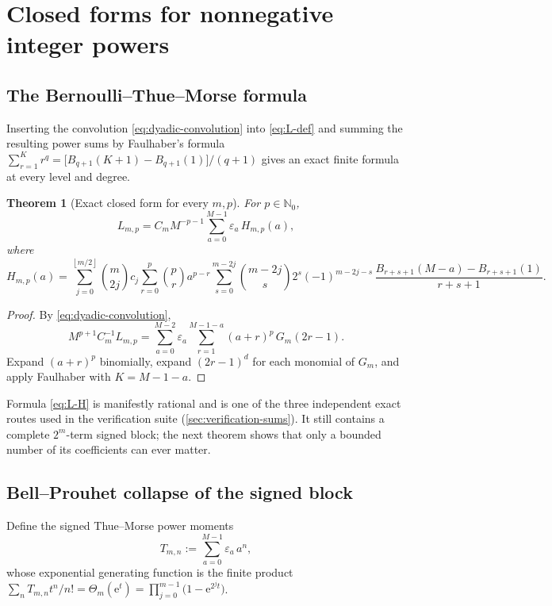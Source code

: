 \documentclass[11pt,oneside]{article}
\numberwithin{equation}{section}
\newtheorem{theorem}{Theorem}[section]
\theoremstyle{definition}
\theoremstyle{remark}
\newcommand{\N}{\mathbb N}
\newcommand{\e}{\mathrm e}
\newcommand{\eps}{\varepsilon}
\newcommand{\floor}[1]{\left\lfloor #1\right\rfloor}
\newcommand{\ThetaTM}{\Theta}
\begin{document}
\section{Closed forms for nonnegative integer powers}
\label{sec:integer}

\subsection{The Bernoulli--Thue--Morse formula}

Inserting the convolution \eqref{eq:dyadic-convolution} into
\eqref{eq:L-def} and summing the resulting power sums by Faulhaber's
formula
$\sum_{r=1}^{K}r^{q}=\bigl[B_{q+1}(K+1)-B_{q+1}(1)\bigr]/(q+1)$
gives an exact finite formula at every level and degree.

\begin{theorem}[Exact closed form for every $m,p$]
\label{thm:bernoulli-TM}
For $p\in\N_0$,
\begin{equation}
 L_{m,p}=C_mM^{-p-1}
 \sum_{a=0}^{M-1}\eps_a\,H_{m,p}(a),
 \label{eq:L-H}
\end{equation}
where
\begin{equation}
 H_{m,p}(a)
 =\sum_{j=0}^{\floor{m/2}}\binom m{2j}c_j
 \sum_{r=0}^{p}\binom pr a^{p-r}
 \sum_{s=0}^{m-2j}\binom{m-2j}{s}2^{s}(-1)^{m-2j-s}\,
 \frac{B_{r+s+1}(M-a)-B_{r+s+1}(1)}{r+s+1}.
 \label{eq:Hnp}
\end{equation}
\end{theorem}

\begin{proof}
By \eqref{eq:dyadic-convolution},
\[
 M^{p+1}C_m^{-1}L_{m,p}
 =\sum_{a=0}^{M-2}\eps_a
 \sum_{r=1}^{M-1-a}(a+r)^{p}\,G_m(2r-1).
\]
Expand $(a+r)^p$ binomially, expand $(2r-1)^{d}$ for each monomial of
$G_m$, and apply Faulhaber with $K=M-1-a$.
\end{proof}

Formula \eqref{eq:L-H} is manifestly rational and is one of the three
independent exact routes used in the verification suite
(\cref{sec:verification-sums}).  It still contains a complete
$2^{m}$-term signed block; the next theorem shows that only a bounded
number of its coefficients can ever matter.

\subsection{Bell--Prouhet collapse of the signed block}

Define the signed Thue--Morse power moments
\begin{equation}
 T_{m,n}:=\sum_{a=0}^{M-1}\eps_a\,a^{n},
 \label{eq:TNm}
\end{equation}
whose exponential generating function is the finite product
$\sum_{n}T_{m,n}t^{n}/n!=\ThetaTM_m(\e^{t})
=\prod_{j=0}^{m-1}\bigl(1-\e^{2^{j}t}\bigr)$.
\end{document}
